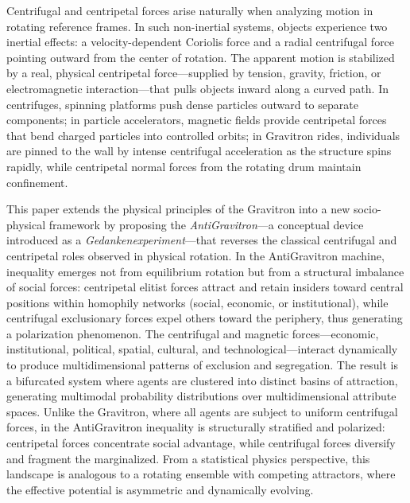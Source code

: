 \documentclass[11pt]{article}
\begin{document}
Centrifugal and centripetal forces arise naturally when analyzing motion in rotating reference frames. In such non-inertial systems, objects experience two inertial effects: a velocity-dependent Coriolis force and a radial centrifugal force pointing outward from the center of rotation. The apparent motion is stabilized by a real, physical centripetal force—supplied by tension, gravity, friction, or electromagnetic interaction—that pulls objects inward along a curved path. In centrifuges, spinning platforms push dense particles outward to separate components; in particle accelerators, magnetic fields provide centripetal forces that bend charged particles into controlled orbits; in Gravitron rides, individuals are pinned to the wall by intense centrifugal acceleration as the structure spins rapidly, while centripetal normal forces from the rotating drum maintain confinement.

This paper extends the physical principles of the Gravitron into a new socio-physical framework by proposing the \textit{AntiGravitron}---a conceptual device introduced as a \textit{Gedankenexperiment}---that reverses the classical centrifugal and centripetal roles observed in physical rotation. In the AntiGravitron machine, inequality emerges not from equilibrium rotation but from a structural imbalance of social forces: centripetal elitist forces attract and retain insiders toward central positions within homophily networks (social, economic, or institutional), while centrifugal exclusionary forces expel others toward the periphery, thus generating a polarization phenomenon. The centrifugal and magnetic forces---economic, institutional, political, spatial, cultural, and technological---interact dynamically to produce multidimensional patterns of exclusion and segregation. The result is a bifurcated system where agents are clustered into distinct basins of attraction, generating multimodal probability distributions over multidimensional attribute spaces. Unlike the Gravitron, where all agents are subject to uniform centrifugal forces, in the AntiGravitron inequality is structurally stratified and polarized: centripetal forces concentrate social advantage, while centrifugal forces diversify and fragment the marginalized. From a statistical physics perspective, this landscape is analogous to a rotating ensemble with competing attractors, where the effective potential is asymmetric and dynamically evolving.
\end{document}
